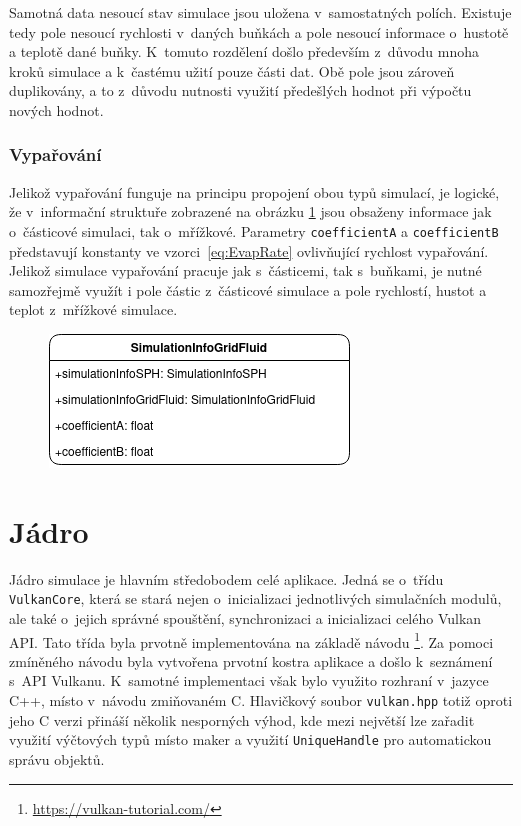 Samotná data nesoucí stav simulace jsou uložena v~samostatných polích. Existuje tedy pole nesoucí rychlosti v~daných buňkách a pole nesoucí informace o~hustotě a teplotě dané buňky. K~tomuto rozdělení došlo především z~důvodu mnoha kroků simulace a k~častému užití pouze části dat. Obě pole jsou zároveň duplikovány, a to z~důvodu nutnosti využití předešlých hodnot při výpočtu nových hodnot. 

\subsubsection{Vypařování}
Jelikož vypařování funguje na principu propojení obou typů simulací, je logické, že v~informační struktuře zobrazené na obrázku \ref{fig:structsEvap} jsou obsaženy informace jak o~částicové simulaci, tak o~mřížkové. Parametry \texttt{coefficientA} a \texttt{coefficientB} představují konstanty ve vzorci~\ref{eq:EvapRate} ovlivňující rychlost vypařování. Jelikož simulace vypařování pracuje jak s~částicemi, tak s~buňkami, je nutné samozřejmě využít i pole částic z~částicové simulace a pole rychlostí, hustot a teplot z~mřížkové simulace.

\begin{figure}[hbt]
	\centering
	\captionsetup{justification=centering}
	\includegraphics[scale=0.6]{obrazky-figures/SimulationInfo.png}
	\label{fig:structsEvap}
\end{figure}


\section{Jádro}
\label{chapter:jadro}

Jádro simulace je hlavním středobodem celé aplikace. Jedná se o~třídu \texttt{VulkanCore}, která se stará nejen o~inicializaci jednotlivých simulačních modulů, ale také o~jejich správné spouštění, synchronizaci a inicializaci celého Vulkan API. Tato třída byla prvotně implementována na základě návodu \footnote{\url{https://vulkan-tutorial.com/}}. Za pomoci zmíněného návodu byla vytvořena prvotní kostra aplikace a došlo k~seznámení s~API Vulkanu. K~samotné implementaci však bylo využito rozhraní v~jazyce C++, místo v~návodu zmiňovaném C. Hlavičkový soubor \texttt{vulkan.hpp} totiž oproti jeho C verzi přináší několik nesporných výhod, kde mezi největší lze zařadit využití výčtových typů místo maker a využití \texttt{UniqueHandle} pro automatickou správu objektů. 

